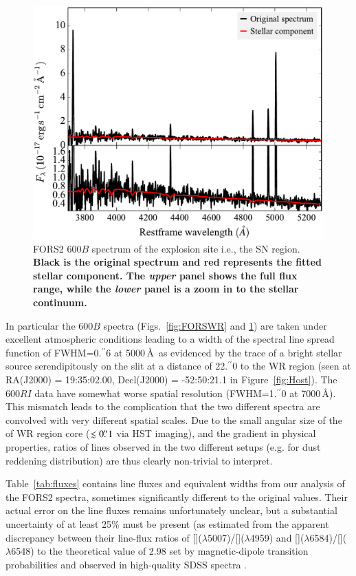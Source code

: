 \documentclass[traditabstract]{aa}
\newcommand{\farc}{\hbox{$.\!\!^{\prime\prime}$}}
\newcommand{\oiii}{[\ion{O}{iii}]}
\newcommand{\nii}{[\ion{N}{ii}]}
\begin{document}
\begin{appendix}
\begin{figure}
\includegraphics[angle=0, width=0.93\columnwidth]{Figs/FORS2_3700_5301_starlight.pdf}
\caption{FORS2 600$B$ spectrum of the explosion site i.e., the SN region. \textbf{Black is the original spectrum and red represents the fitted stellar component. The \textit{upper} panel shows the full flux range, while the \textit{lower} panel is a zoom in to the stellar continuum.}}
\label{fig:FORSSN}
\end{figure}

In particular the 600$B$ spectra (Figs.~\ref{fig:FORSWR} and \ref{fig:FORSSN}) are taken under excellent atmospheric conditions leading to a width of the spectral line spread function of FWHM=0\farc{6} at 5000\,\AA\, as evidenced by the trace of a bright stellar source serendipitously on the slit at a distance of 22\farc{0} to the WR region (seen at RA(J2000) = 19:35:02.00, Decl(J2000) = -52:50:21.1 in Figure~\ref{fig:Host}). The 600$RI$ data have somewhat worse spatial resolution (FWHM=1\farc{0} at 7000\,\AA). This mismatch leads to the complication that the two different spectra are convolved with very different spatial scales. Due to the small angular size of the of WR region core ($\lesssim 0\farc{1}$ via HST imaging), and the gradient in physical properties, ratios of lines observed in the two different setups (e.g. for dust reddening distribution) are thus clearly non-trivial to interpret.

Table~\ref{tab:fluxes} contains line fluxes and equivalent widths from our analysis of the FORS2 spectra, sometimes significantly different to the original \citet{2006A&A...454..103H} values. Their actual error on the line fluxes remains unfortunately unclear, but a substantial uncertainty of at least 25\% must be present (as estimated from the apparent discrepancy between their line-flux ratios of \oiii($\lambda$5007)/\oiii($\lambda$4959) and \nii($\lambda$6584)/\nii($\lambda$6548) to the theoretical value of 2.98 set by magnetic-dipole transition probabilities and observed in high-quality SDSS spectra \citep[e.g.][]{2000MNRAS.312..813S, 2006agna.book.....O, 2016MNRAS.459.3475W}.


\end{appendix}
\end{document}
